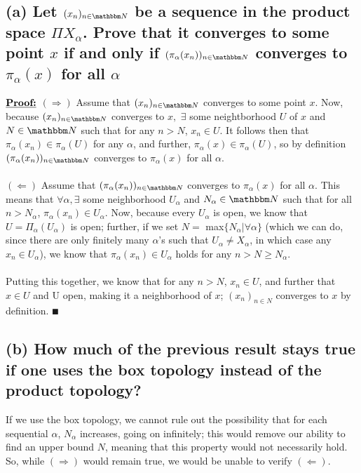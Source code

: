 \documentclass{article}
\begin{document}
\subsection*{(a) Let $(x_n)_{n \in \N}$ be a sequence in the product space $\Pi X_\alpha$. Prove that it converges to some point $x$ if and only if $(\pi_\alpha(x_n))_{n \in \N}$ converges to $\pi_\alpha(x)$ for all $\alpha$}
$\textbf{\underline{Proof:}}$ $(\Rightarrow)$ Assume that $(x_n)_{n \in \N}$ converges to some point $x$. Now, because $(x_n)_{n \in \N}$ converges to $x,$ $\exists$ some neightborhood $U$ of $x$ and $N \in \N$ such that for any $n > N$, $x_n \in U$. It follows then that $\pi_\alpha(x_n) \in \pi_\alpha(U)$ for any $\alpha$, and further, $\pi_\alpha(x) \in \pi_\alpha(U)$, so by definition $(\pi_\alpha(x_n))_{n \in \N}$ converges to $\pi_\alpha(x)$ for all $\alpha$. \\ \\
$(\Leftarrow)$ Assume that $(\pi_\alpha(x_n))_{n \in \N}$ converges to $\pi_\alpha(x)$ for all $\alpha$. This means that $\forall \alpha, \exists$ some neighborhood $U_\alpha$ and $N_\alpha \in \N$ such that for all $n > N_\alpha$, $\pi_\alpha(x_n) \in U_\alpha$. Now, because every $U_\alpha$ is open, we know that $U = \Pi_\alpha(U_\alpha)$ is open; further, if we set $N = $ max$\{N_\alpha | \forall \alpha\}$ (which we can do, since there are only finitely many $\alpha$'s such that $U_\alpha \neq X_\alpha$, in which case any $x_n \in U_\alpha$), we know that $\pi_\alpha(x_n) \in U_\alpha$ holds for any $n > N \geq N_\alpha$.\\ \\
Putting this together, we know that for any $n > N$, $x_n \in U$, and further that $x \in U$ and U open, making it a neighborhood of $x$; $(x_n)_{n \in N}$ converges to $x$ by definition. $\QED$

\subsection*{(b) How much of the previous result stays true if one uses the box topology instead of the product topology?}
If we use the box topology, we cannot rule out the possibility that for each sequential $\alpha$, $N_\alpha$ increases, going on infinitely; this would remove our ability to find an upper bound $N$, meaning that this property would not necessarily hold. So, while $(\Rightarrow)$ would remain true, we would be unable to verify $(\Leftarrow)$. 
\end{document}
